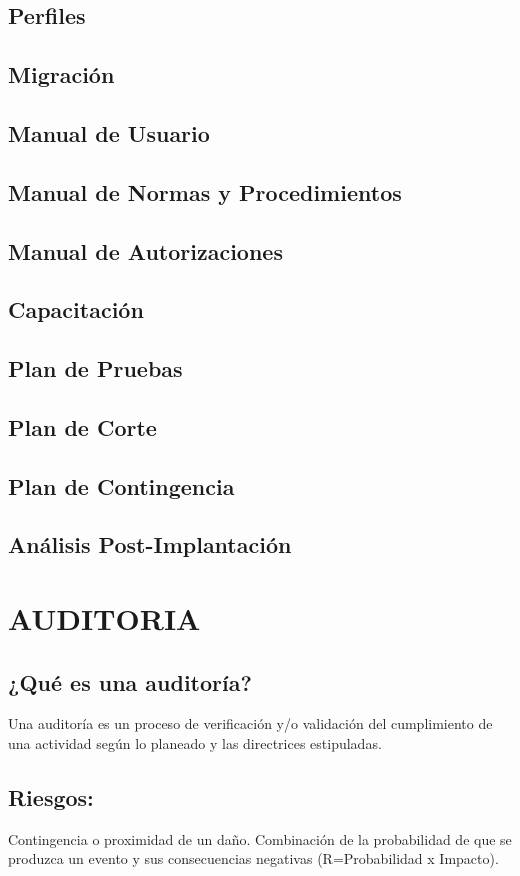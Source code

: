 \documentclass[12pt]{book}
\begin{document}
\section{Perfiles}
\section{Migración}
\section{Manual de Usuario}
\section{Manual de Normas y Procedimientos}
\section{Manual de Autorizaciones}
\section{Capacitación}
\section{Plan de Pruebas}
\section{Plan de Corte}
\section{Plan de Contingencia}
\section{Análisis Post-Implantación}


\chapter{AUDITORIA}
\section{¿Qué es una auditoría?}
Una auditoría es un proceso de verificación y/o validación del cumplimiento de una actividad según lo planeado y las directrices estipuladas.
\section{Riesgos:} Contingencia o proximidad de un daño. Combinación de la probabilidad de que se produzca un
evento y sus consecuencias negativas (R=Probabilidad x Impacto).
\end{document}
